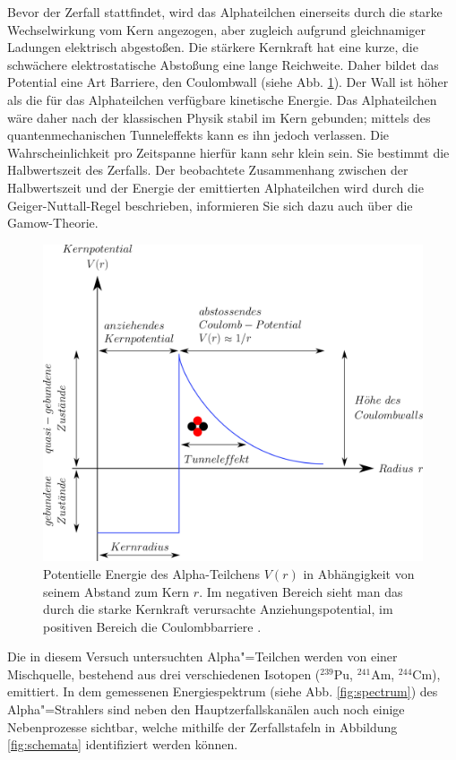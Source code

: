 Bevor der Zerfall stattfindet, wird das Alphateilchen einerseits durch die starke Wechselwirkung vom Kern angezogen, aber zugleich aufgrund gleichnamiger Ladungen elektrisch abgestoßen. Die stärkere Kernkraft hat eine kurze, die schwächere elektrostatische Abstoßung eine lange Reichweite. Daher bildet das Potential eine Art Barriere, den Coulombwall (siehe Abb. \ref{fig:coulomb-barriere}). Der Wall ist höher als die für das Alphateilchen verfügbare kinetische Energie. Das Alphateilchen wäre daher nach der klassischen Physik stabil im Kern gebunden; mittels des quantenmechanischen Tunneleffekts kann es ihn jedoch verlassen. Die Wahrscheinlichkeit pro Zeitspanne hierfür kann sehr klein sein. Sie bestimmt die Halbwertszeit des Zerfalls. Der beobachtete Zusammenhang zwischen der Halbwertszeit und der Energie der emittierten Alphateilchen wird durch die Geiger-Nuttall-Regel beschrieben, informieren Sie sich dazu auch über die Gamow-Theorie. \cite{dewiki:240085809}
\begin{figure}[h]
	\centering
	\includegraphics[width=0.6\linewidth]{img/Tunneleffekt_alpha_zerfall.png}
	\caption{Potentielle Energie des Alpha-Teilchens $V(r)$ in Abhängigkeit von seinem Abstand zum Kern $r$. Im negativen Bereich sieht man das durch die starke Kernkraft verursachte Anziehungspotential, im positiven Bereich die Coulombbarriere \cite{img:coulombwall}.}
	\label{fig:coulomb-barriere}
\end{figure}

Die in diesem Versuch untersuchten Alpha"=Teilchen werden von einer Mischquelle, bestehend aus drei verschiedenen Isotopen ($^{239}$Pu, $^{241}$Am, $^{244}$Cm), emittiert. In dem gemessenen Energiespektrum (siehe Abb. \ref{fig:spectrum}) des Alpha"=Strahlers sind neben den Hauptzerfallskanälen auch noch einige Nebenprozesse sichtbar, welche mithilfe der Zerfallstafeln in Abbildung \ref{fig:schemata} identifiziert werden können.

